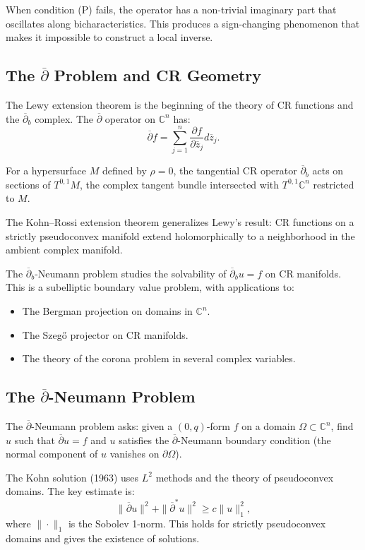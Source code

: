 When condition (P) fails, the operator has a non-trivial imaginary part that oscillates along bicharacteristics. This produces a sign-changing phenomenon that makes it impossible to construct a local inverse.

\subsection{The \texorpdfstring{$\overline{\partial}$}{d-bar} Problem and CR Geometry}

The Lewy extension theorem is the beginning of the theory of CR functions and the $\overline{\partial}_b$ complex. The $\overline{\partial}$ operator on $\mathbb{C}^n$ has:
\[
\overline{\partial} f = \sum_{j=1}^n \frac{\partial f}{\partial \overline{z}_j} d\overline{z}_j.
\]

For a hypersurface $M$ defined by $\rho = 0$, the tangential CR operator $\overline{\partial}_b$ acts on sections of $T^{0,1}M$, the complex tangent bundle intersected with $T^{0,1}\mathbb{C}^n$ restricted to $M$.

The Kohn--Rossi extension theorem generalizes Lewy's result: CR functions on a strictly pseudoconvex manifold extend holomorphically to a neighborhood in the ambient complex manifold.

The $\overline{\partial}_b$-Neumann problem studies the solvability of $\overline{\partial}_b u = f$ on CR manifolds. This is a subelliptic boundary value problem, with applications to:
\begin{itemize}
    \item The Bergman projection on domains in $\mathbb{C}^n$.
    \item The Szeg\H{o} projector on CR manifolds.
    \item The theory of the corona problem in several complex variables.
\end{itemize}

\subsection{The \texorpdfstring{$\overline{\partial}$}{d-bar}-Neumann Problem}

The $\overline{\partial}$-Neumann problem asks: given a $(0,q)$-form $f$ on a domain $\Omega \subset \mathbb{C}^n$, find $u$ such that $\overline{\partial} u = f$ and $u$ satisfies the $\overline{\partial}$-Neumann boundary condition (the normal component of $u$ vanishes on $\partial \Omega$).

The Kohn solution (1963) uses $L^2$ methods and the theory of pseudoconvex domains. The key estimate is:
\[
\|\overline{\partial} u\|^2 + \|\overline{\partial}^* u\|^2 \geq c \|u\|^2_1,
\]
where $\|\cdot\|_1$ is the Sobolev 1-norm. This holds for strictly pseudoconvex domains and gives the existence of solutions.

